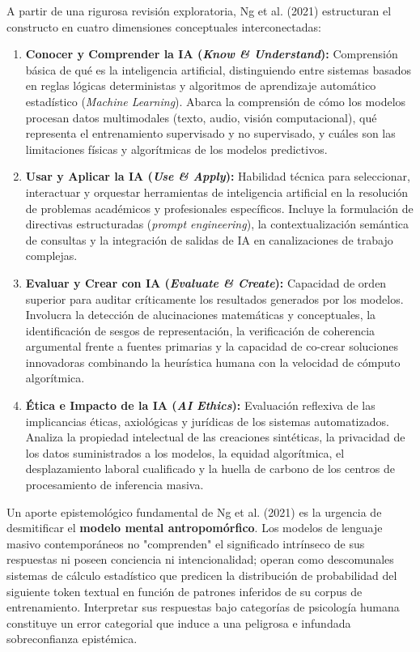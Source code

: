 A partir de una rigurosa revisión exploratoria, Ng et al. (2021) estructuran el constructo en cuatro dimensiones conceptuales interconectadas:
\begin{enumerate}
    \item \textbf{Conocer y Comprender la IA (\textit{Know \& Understand}):} Comprensión básica de qué es la inteligencia artificial, distinguiendo entre sistemas basados en reglas lógicas deterministas y algoritmos de aprendizaje automático estadístico (\textit{Machine Learning}). Abarca la comprensión de cómo los modelos procesan datos multimodales (texto, audio, visión computacional), qué representa el entrenamiento supervisado y no supervisado, y cuáles son las limitaciones físicas y algorítmicas de los modelos predictivos.
    \item \textbf{Usar y Aplicar la IA (\textit{Use \& Apply}):} Habilidad técnica para seleccionar, interactuar y orquestar herramientas de inteligencia artificial en la resolución de problemas académicos y profesionales específicos. Incluye la formulación de directivas estructuradas (\textit{prompt engineering}), la contextualización semántica de consultas y la integración de salidas de IA en canalizaciones de trabajo complejas.
    \item \textbf{Evaluar y Crear con IA (\textit{Evaluate \& Create}):} Capacidad de orden superior para auditar críticamente los resultados generados por los modelos. Involucra la detección de alucinaciones matemáticas y conceptuales, la identificación de sesgos de representación, la verificación de coherencia argumental frente a fuentes primarias y la capacidad de co-crear soluciones innovadoras combinando la heurística humana con la velocidad de cómputo algorítmica.
    \item \textbf{Ética e Impacto de la IA (\textit{AI Ethics}):} Evaluación reflexiva de las implicancias éticas, axiológicas y jurídicas de los sistemas automatizados. Analiza la propiedad intelectual de las creaciones sintéticas, la privacidad de los datos suministrados a los modelos, la equidad algorítmica, el desplazamiento laboral cualificado y la huella de carbono de los centros de procesamiento de inferencia masiva.
\end{enumerate}

Un aporte epistemológico fundamental de Ng et al. (2021) es la urgencia de desmitificar el \textbf{modelo mental antropomórfico}. Los modelos de lenguaje masivo contemporáneos no "comprenden" el significado intrínseco de sus respuestas ni poseen conciencia ni intencionalidad; operan como descomunales sistemas de cálculo estadístico que predicen la distribución de probabilidad del siguiente token textual en función de patrones inferidos de su corpus de entrenamiento. Interpretar sus respuestas bajo categorías de psicología humana constituye un error categorial que induce a una peligrosa e infundada sobreconfianza epistémica.


